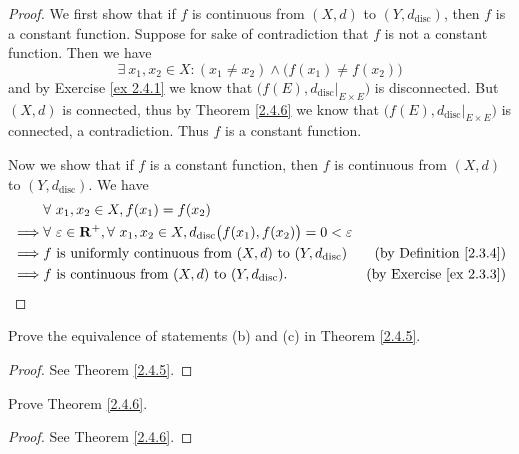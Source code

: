 \begin{proof}
    We first show that if \(f\) is continuous from \((X, d)\) to \((Y, d_{\text{disc}})\), then \(f\) is a constant function.
    Suppose for sake of contradiction that \(f\) is not a constant function.
    Then we have
    \[
        \exists\ x_1, x_2 \in X : (x_1 \neq x_2) \land \big(f(x_1) \neq f(x_2)\big)
    \]
    and by Exercise \ref{ex 2.4.1} we know that \(\big(f(E), d_{\text{disc}}|_{E \times E}\big)\) is disconnected.
    But \((X, d)\) is connected, thus by Theorem \ref{2.4.6} we know that \(\big(f(E), d_{\text{disc}}|_{E \times E}\big)\) is connected, a contradiction.
    Thus \(f\) is a constant function.

    Now we show that if \(f\) is a constant function, then \(f\) is continuous from \((X, d)\) to \((Y, d_{\text{disc}})\).
    We have
    \begin{align*}
                 & \forall\ x_1, x_2 \in X, f(x_1) = f(x_2)                                                                                                                        \\
        \implies & \forall\ \varepsilon \in \mathbf{R}^+, \forall\ x_1, x_2 \in X, d_{\text{disc}}\big(f(x_1), f(x_2)\big) = 0 < \varepsilon                                       \\
        \implies & f \text{ is uniformly continuous from } (X, d) \text{ to } (Y, d_{\text{disc}})                                           & \text{(by Definition \ref{2.3.4})}  \\
        \implies & f \text{ is continuous from } (X, d) \text{ to } (Y, d_{\text{disc}}).                                                    & \text{(by Exercise \ref{ex 2.3.3})}
    \end{align*}
\end{proof}

\begin{exercise}\label{ex 2.4.3}
    Prove the equivalence of statements (b) and (c) in Theorem \ref{2.4.5}.
\end{exercise}

\begin{proof}
    See Theorem \ref{2.4.5}.
\end{proof}

\begin{exercise}\label{ex 2.4.4}
    Prove Theorem \ref{2.4.6}.
\end{exercise}

\begin{proof}
    See Theorem \ref{2.4.6}.
\end{proof}

